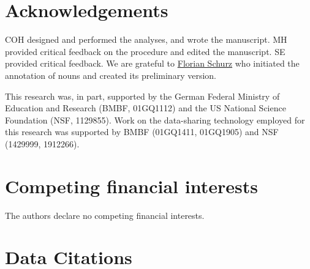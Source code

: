 \documentclass[english]{article}
\begin{document}
\section*{Acknowledgements}

%
COH designed and performed the analyses, and wrote the manuscript.
%
MH provided critical feedback on the procedure and edited the manuscript.
%
SE provided critical feedback.
%
We are grateful to \href{www.florianschurz.de}{Florian Schurz} who initiated the
annotation of nouns and created its preliminary version.%

This research was, in part, supported by the German Federal Ministry of
Education and Research (BMBF, 01GQ1112) and the US National Science Foundation
(NSF, 1129855). Work on the data-sharing technology employed for this research
was supported by BMBF (01GQ1411, 01GQ1905) and NSF (1429999, 1912266).

\section*{Competing financial interests}
The authors declare no competing financial interests.


{\small
}

%
%


\section{Data Citations}
\end{document}
